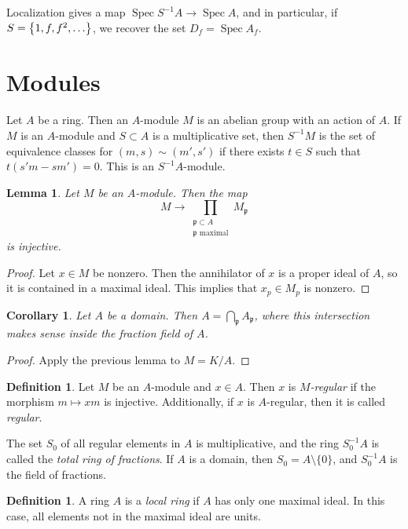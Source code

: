 \documentclass[leqno, openany]{memoir}
\newtheorem{cor}[thm]{Corollary}
\newtheorem{lem}[thm]{Lemma}
\theoremstyle{definition}
\newtheorem{defn}[thm]{Definition}
\theoremstyle{remark}
\theoremstyle{plain}
\theoremstyle{definition}
\theoremstyle{remark}
\newcommand{\mf}[1]{\mathfrak{#1}}
\DeclareMathOperator{\spec}{Spec}
\begin{document}
Localization gives a map $\spec S^{-1}A \to \spec A$, and in particular, if $S
= \qty{1, f, f^2, \ldots}$, we recover the set $D_f = \spec A_f$.

\section{Modules}%

Let $A$ be a ring. Then an $A$-module $M$ is an abelian group with an action of
$A$. If $M$ is an $A$-module and $S \subset A$ is a multiplicative set, then
$S^{-1}M$ is the set of equivalence classes for $(m,s) \sim (m',s')$ if there
exists $t \in S$ such that $t(s'm - sm') = 0$. This is an $S^{-1}A$-module.

\begin{lem} Let $M$ be an $A$-module. Then the map \[ M \to \prod_{\substack{
\mf{p} \subset A \\ \mf{p} \text{ maximal}}} M_{\mf{p}} \] is injective.
\end{lem}

\begin{proof} Let $x \in M$ be nonzero. Then the annihilator of $x$ is a proper
ideal of $A$, so it is contained in a maximal ideal. This implies that $x_p \in
M_p$ is nonzero.  \end{proof}

\begin{cor} Let $A$ be a domain. Then $A = \bigcap_{\mf{p}} A_{\mf{p}}$, where
this intersection makes sense inside the fraction field of $A$.  \end{cor}

\begin{proof} Apply the previous lemma to $M = K/A$.  \end{proof}

\begin{defn} Let $M$ be an $A$-module and $x \in A$. Then $x$ is
\textit{$M$-regular} if the morphism $m \mapsto xm$ is injective. Additionally,
if $x$ is $A$-regular, then it is called \textit{regular}.  \end{defn}

The set $S_0$ of all regular elements in $A$ is multiplicative, and the ring
$S_0^{-1}A$ is called the \textit{total ring of fractions}. If $A$ is a domain,
then $S_0 = A \setminus \{0 \}$, and $S_0^{-1}A$ is the field of fractions.

\begin{defn} A ring $A$ is a \textit{local ring} if $A$ has only one maximal
ideal. In this case, all elements not in the maximal ideal are units.
\end{defn}
\end{document}

